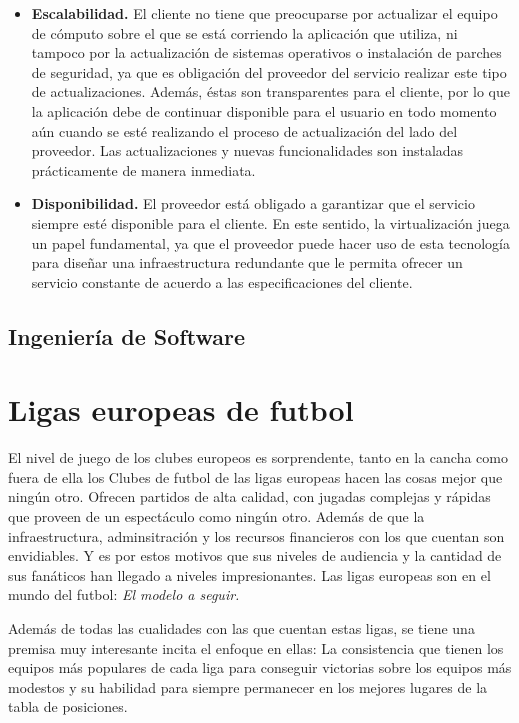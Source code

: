 \begin{itemize}
	\item \textbf{Escalabilidad.} El cliente no tiene que preocuparse por actualizar el equipo de cómputo sobre el que se está corriendo la aplicación que utiliza, ni tampoco por la actualización de sistemas operativos o instalación de parches de seguridad, ya que es obligación del proveedor del servicio realizar este tipo de actualizaciones. Además, éstas son transparentes para el cliente, por lo que la aplicación debe de continuar disponible para el usuario en todo momento aún cuando se esté realizando el proceso de actualización del lado del proveedor. Las actualizaciones y nuevas funcionalidades son instaladas prácticamente de manera inmediata.
	
	\item \textbf{Disponibilidad.} El proveedor está obligado a garantizar que el servicio siempre esté disponible para el cliente. En este sentido, la virtualización juega un papel fundamental, ya que el proveedor puede hacer uso de esta tecnología para diseñar una infraestructura redundante que le permita ofrecer un servicio constante de acuerdo a las especificaciones del cliente.
	
\end{itemize}

\subsection{Ingeniería de Software}









\section{Ligas europeas de futbol}
El nivel de juego de los clubes europeos es sorprendente, tanto en la cancha como fuera de ella los Clubes de futbol de las ligas europeas hacen las cosas mejor que ningún otro. Ofrecen partidos de alta calidad, con jugadas complejas y rápidas que proveen de un espectáculo como ningún otro. Además de que la infraestructura, adminsitración y los recursos financieros con los que cuentan son envidiables. Y es por estos motivos que sus niveles de audiencia y la cantidad de sus fanáticos han llegado a niveles impresionantes. Las ligas europeas son en el mundo del futbol: \emph{El modelo a seguir.}


Además de todas las cualidades con las que cuentan estas ligas, se tiene una premisa muy interesante incita el enfoque en ellas: La consistencia que tienen los equipos más populares de cada liga para conseguir victorias sobre los equipos más modestos y su habilidad para siempre permanecer en los mejores lugares de la tabla de posiciones. 

